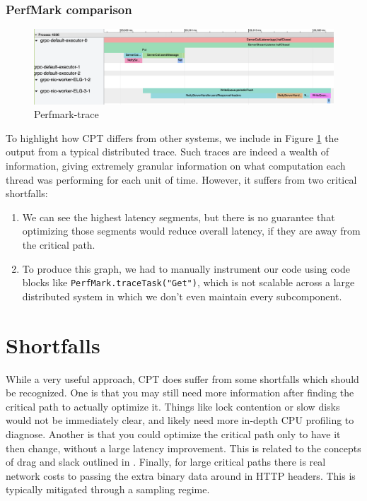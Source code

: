 \documentclass[11pt, twoside, twocolumn]{extarticle}
\begin{document}
\subsubsection*{PerfMark comparison}

\begin{figure}
\includegraphics[width=\linewidth]{
PERFMARK_GRAPH}
\caption[width=\linewidth]{Perfmark-trace}
\label{perfmark}
\end{figure}

To highlight how CPT differs from other systems, we include in Figure \ref{perfmark} the output from a typical distributed trace. Such traces are indeed a wealth of information, giving extremely granular information on what computation each thread was performing for each unit of time.  However, it suffers from two critical shortfalls:

\begin{enumerate}
    \item We can see the highest latency segments, but there is no guarantee that optimizing those segments would reduce overall latency, if they are away from the critical path.
    \item To produce this graph, we had to manually instrument our code using code blocks like \lstinline{PerfMark.traceTask("Get")}, which is not scalable across a large distributed system in which we don't even maintain every subcomponent.
\end{enumerate}

\section{Shortfalls}

While a very useful approach, CPT does suffer from some shortfalls which should be recognized.  One is that you may still need more information after finding the critical path to actually optimize it.  Things like lock contention or slow disks would not be immediately clear, and likely need more in-depth CPU profiling to diagnose.  Another is that you could optimize the critical path only to have it then change, without a large latency improvement.  This is related to the concepts of drag and slack outlined in \cite{10.1145/3526967}. Finally, for large critical paths there is real network costs to passing the extra binary data around in HTTP headers.  This is typically mitigated through a sampling regime.
\end{document}
